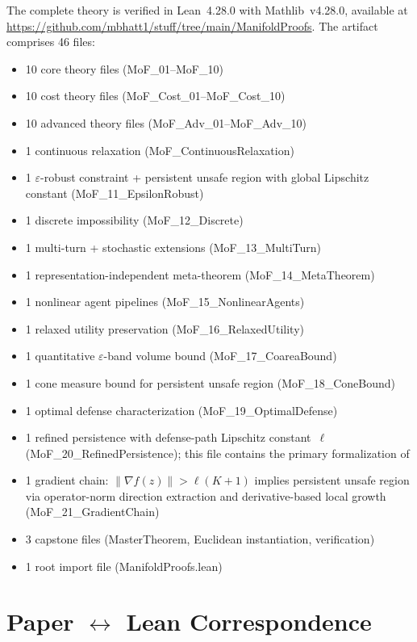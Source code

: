 \documentclass[11pt]{article}
\begin{document}
The complete theory is verified in Lean~4.28.0 with Mathlib~v4.28.0,
available at
\url{https://github.com/mbhatt1/stuff/tree/main/ManifoldProofs}.
The artifact comprises 46 files:
\begin{itemize}[nosep]
  \item 10 core theory files (MoF\_01--MoF\_10)
  \item 10 cost theory files (MoF\_Cost\_01--MoF\_Cost\_10)
  \item 10 advanced theory files (MoF\_Adv\_01--MoF\_Adv\_10)
  \item 1 continuous relaxation (MoF\_ContinuousRelaxation)
  \item 1 $\varepsilon$-robust constraint + persistent unsafe region
    with global Lipschitz constant
    (MoF\_11\_EpsilonRobust)
  \item 1 discrete impossibility (MoF\_12\_Discrete)
  \item 1 multi-turn + stochastic extensions
    (MoF\_13\_MultiTurn)
  \item 1 representation-independent meta-theorem
    (MoF\_14\_MetaTheorem)
  \item 1 nonlinear agent pipelines (MoF\_15\_NonlinearAgents)
  \item 1 relaxed utility preservation (MoF\_16\_RelaxedUtility)
  \item 1 quantitative $\varepsilon$-band volume bound
    (MoF\_17\_CoareaBound)
  \item 1 cone measure bound for persistent unsafe region
    (MoF\_18\_ConeBound)
  \item 1 optimal defense characterization
    (MoF\_19\_OptimalDefense)
  \item 1 refined persistence with defense-path Lipschitz constant~$\ell$
    (MoF\_20\_RefinedPersistence); this file contains the primary
    formalization of 
  \item 1 gradient chain: $\|\nabla f(z)\| > \ell(K+1)$ implies
    persistent unsafe region via operator-norm direction extraction
    and derivative-based local growth
    (MoF\_21\_GradientChain)
  \item 3 capstone files (MasterTheorem, Euclidean instantiation,
    verification)
  \item 1 root import file (ManifoldProofs.lean)
\end{itemize}


\section{Paper \texorpdfstring{$\leftrightarrow$}{<->} Lean Correspondence}
\label{app:lean-correspondence}
\end{document}
